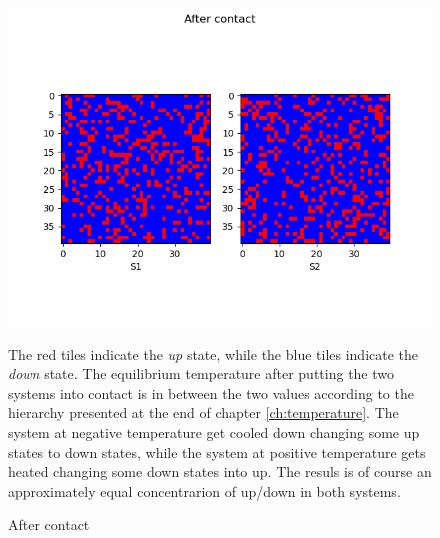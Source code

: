 \begin{figure}[h]
    \centering
    \includegraphics[scale=0.7]{./images/T1_T2_after.png}
    \caption{After contact}{The red tiles indicate the \emph{up} state, while the blue tiles indicate the \emph{down} state. The equilibrium temperature after putting the two systems into contact is in between the two values according to the hierarchy presented 
    at the end of chapter \ref{ch:temperature}. The system at negative temperature get cooled down changing some up states to down states, while the system at positive temperature
    gets heated changing some down states into up. The resuls is of course an approximately equal concentrarion of up/down in both systems.}
    \label{fig:after}
\end{figure}